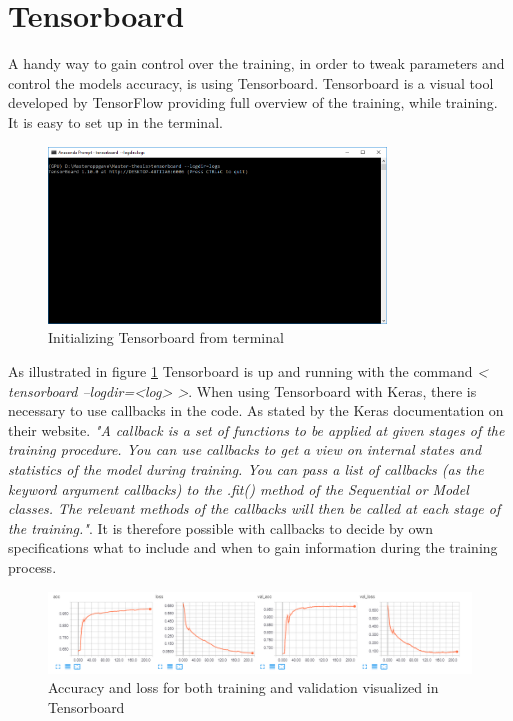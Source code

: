 \documentclass[USenglish]{ifimaster}  %
\begin{document}
\section{Tensorboard}
A handy way to gain control over the training, in order to tweak parameters and control the models accuracy, is using Tensorboard. Tensorboard is a visual tool developed by TensorFlow providing full overview of the training, while training. It is easy to set up in the terminal.
\begin{figure}[ht]
    \centering
    \includegraphics[width=0.8\textwidth]{bilder/tensorboard_anaconda_prompt.PNG}
    \caption{Initializing Tensorboard from terminal}
    \label{fig:tensorboard_anaconda_prompt}
\end{figure}
\newline
As illustrated in figure \ref{fig:tensorboard_anaconda_prompt} Tensorboard is up and running with the command \textit{< tensorboard --logdir=<log> >}. 
\newline
When using Tensorboard with Keras, there is necessary to use callbacks in the code. As stated by the Keras documentation on their website.
\newline
\newline
\textit{"A callback is a set of functions to be applied at given stages of the training procedure. You can use callbacks to get a view on internal states and statistics of the model during training. You can pass a list of callbacks (as the keyword argument callbacks) to the .fit() method of the Sequential or Model classes. The relevant methods of the callbacks will then be called at each stage of the training."}\cite{website:Keras_doc}. 
\newline
\newline
It is therefore possible with callbacks to decide by own specifications what to include and when to gain information during the training process.  
\begin{figure}[ht]
    \centering
    \includegraphics[width=1\textwidth]{bilder/tensorboard_acc_loss.PNG}
    \caption{Accuracy and loss for both training and validation visualized in Tensorboard}
    \label{fig:accuracy_loss}
\end{figure}
\end{document}

